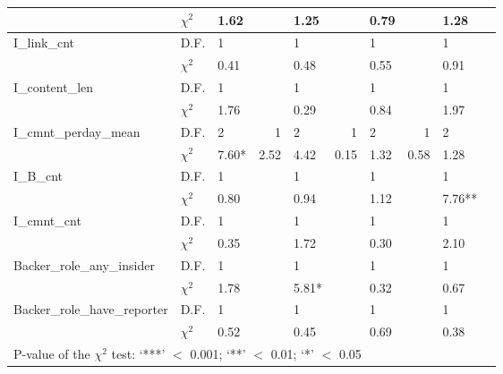 \documentclass[10pt,journal,compsoc]{IEEEtran}
\begin{document}
\begin{appendices}
\begin{table}[]
\begin{tabular}{lp{0.5cm}p{0.8cm}rp{0.9cm}rp{0.8cm}rp{0.8cm}r}
                 & $\chi^2$ & 1.62  &       & 1.25  &       & 0.79  &       & 1.28  &  \bigstrut[b]\\
           \midrule
           \multicolumn{1}{l}{\multirow{2}[2]{*}{I\_link\_cnt}} & D.F.  & 1     &       & 1     &       & 1     &       & 1     &  \bigstrut[t]\\
                 & $\chi^2$ & 0.41  &       & 0.48  &       & 0.55  &       & 0.91  &  \bigstrut[b]\\
           \midrule
           \multicolumn{1}{l}{\multirow{2}[2]{*}{I\_content\_len}} & D.F.  & 1     &       & 1     &       & 1     &       & 1     &  \bigstrut[t]\\
                 & $\chi^2$ & 1.76  &       & 0.29  &       & 0.84  &       & 1.97  &  \bigstrut[b]\\
           \midrule
           \multicolumn{1}{l}{\multirow{2}[2]{*}{I\_cmnt\_perday\_mean}} & D.F.  & 2     & \multicolumn{1}{p{4em}}{1} & 2     & \multicolumn{1}{p{3em}}{1} & 2     & \multicolumn{1}{p{3em}}{1} & 2     & \multicolumn{1}{p{5.085em}}{} \bigstrut[t]\\
                 & $\chi^2$ & 7.60* & \multicolumn{1}{p{4em}}{2.52} & 4.42  & \multicolumn{1}{p{3em}}{0.15} & 1.32  & \multicolumn{1}{p{3em}}{0.58} & 1.28  & \multicolumn{1}{p{5.085em}}{} \bigstrut[b]\\
           \midrule
           \multicolumn{1}{l}{\multirow{2}[2]{*}{I\_B\_cnt}} & D.F.  & 1     &       & 1     &       & 1     &       & 1     &  \bigstrut[t]\\
                 & $\chi^2$ & 0.80  &       & 0.94  &       & 1.12  &       & 7.76** &  \bigstrut[b]\\
           \midrule
           \multicolumn{1}{l}{\multirow{2}[2]{*}{I\_cmnt\_cnt}} & D.F.  & 1     &       & 1     &       & 1     &       & 1     &  \bigstrut[t]\\
                 & $\chi^2$ & 0.35  &       & 1.72  &       & 0.30  &       & 2.10  &  \bigstrut[b]\\
           \midrule
           \multicolumn{1}{l}{\multirow{2}[2]{*}{Backer\_role\_any\_insider}} & D.F.  & 1     &       & 1     &       & 1     &       & 1     &  \bigstrut[t]\\
                 & $\chi^2$ & 1.78  &       & 5.81* &       & 0.32  &       & 0.67  &  \bigstrut[b]\\
           \midrule
           \multicolumn{1}{l}{\multirow{2}[1]{*}{Backer\_role\_have\_reporter}} & D.F.  & 1     &       & 1     &       & 1     &       & 1     &  \bigstrut[t]\\
                 & $\chi^2$ & 0.52  &       & 0.45  &       & 0.69  &       & 0.38  &  \\
                 \bottomrule
      \multicolumn{10}{l}{P-value of the $\chi^2$ test: `***' $<$ 0.001; `**' $<$ 0.01; `*' $<$ 0.05} \bigstrut[t]\\
           \end{tabular}%
         \label{tab:rq3_analysis}%
       \end{table}%



\end{appendices}
\end{document}
